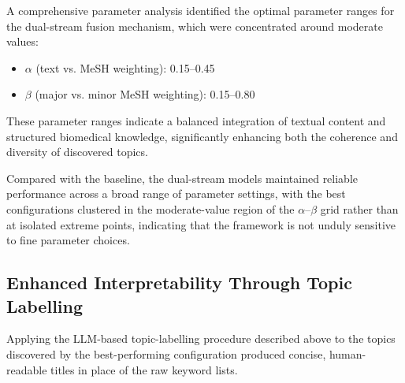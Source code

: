 \documentclass[authorproof,JACIII,researchpaper]{fujipressarticle}
\begin{document}
A comprehensive parameter analysis identified the optimal parameter ranges for the dual-stream fusion mechanism, which were concentrated around moderate values:

\begin{itemize}
    \item $\alpha$ (text vs. MeSH weighting): 0.15--0.45
    \item $\beta$ (major vs. minor MeSH weighting): 0.15--0.80
\end{itemize}

These parameter ranges indicate a balanced integration of textual content and structured biomedical knowledge, significantly enhancing both the coherence and diversity of discovered topics.

{\color{red}%
Compared with the baseline, the dual-stream models maintained reliable performance across a broad range of parameter settings, with the best configurations clustered in the moderate-value region of the $\alpha$--$\beta$ grid rather than at isolated extreme points, indicating that the framework is not unduly sensitive to fine parameter choices.
}%

\subsection{Enhanced Interpretability Through Topic Labelling}

{\color{red}%
Applying the LLM-based topic-labelling procedure described above to the topics discovered by the best-performing configuration produced concise, human-readable titles in place of the raw keyword lists.
}%
\end{document}

